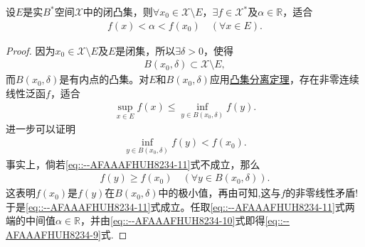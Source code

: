 \documentclass[../../main.tex]{subfiles}%
\begin{document}
\begin{corollary}[Ascoli定理]\label{corollary:泛函分析--Ascoli定理}
设$E$是实$B^*$空间$\mathscr{X}$中的闭凸集，则$\forall x_0 \in \mathscr{X} \setminus E$，$\exists f \in \mathscr{X}^*$及$\alpha \in \mathbb{R}$，适合
\begin{align}
f(x) < \alpha < f(x_0) \quad (\forall x \in E).
\label{eq::--AFAAAFHUH8234-9}
\end{align}
\end{corollary}
\begin{proof}
因为$x_0 \in \mathscr{X} \setminus E$及$E$是闭集，所以$\exists \delta > 0$，使得
\begin{align*}
B(x_0, \delta) \subset \mathscr{X} \setminus E,
\end{align*}
而$B(x_0, \delta)$是有内点的凸集。对$E$和$B(x_0, \delta)$应用\hyperref[theorem:泛函分析--凸集分离定理]{凸集分离定理}，存在非零连续线性泛函$f$，适合
\begin{align}
\sup\limits_{x \in E} f(x) \leqslant \inf\limits_{y \in B(x_0, \delta)} f(y).
\label{eq::--AFAAAFHUH8234-10}
\end{align}
进一步可以证明
\begin{align}
\inf\limits_{y \in B(x_0, \delta)} f(y) < f(x_0).
\label{eq::--AFAAAFHUH8234-11}
\end{align}
事实上，倘若\eqref{eq::--AFAAAFHUH8234-11}式不成立，那么
\begin{align*}
f(y) \geqslant f(x_0) \quad (\forall y \in B(x_0, \delta)).
\end{align*}
这表明$f(x_0)$是$f(y)$在$B(x_0, \delta)$中的极小值，再由可知,这与$f$的非零线性矛盾!于是\eqref{eq::--AFAAAFHUH8234-11}式成立。任取\eqref{eq::--AFAAAFHUH8234-11}式两端的中间值$\alpha \in \mathbb{R}$，并由\eqref{eq::--AFAAAFHUH8234-10}式即得\eqref{eq::--AFAAAFHUH8234-9}式.
\end{proof}
\end{document}
